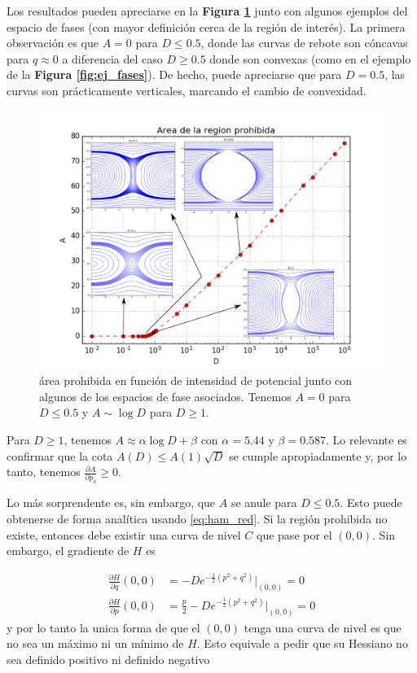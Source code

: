 \documentclass[twoside, 12pt]{article}
\providecommand{\dpart}[2]{\frac{\partial#1}{\partial#2}}
\begin{document}
Los resultados pueden apreciarse en la \textbf{Figura \ref{fig:AvsD}} junto con algunos ejemplos del espacio de fases (con mayor definición cerca de la región de interés).
La primera observación es que $A=0$ para $D\leq 0.5$, donde las curvas de rebote son cóncavas para $q\approx 0$ a diferencia del caso $D\geq 0.5$ donde son convexas (como en el ejemplo
de la \textbf{Figura \ref{fig:ej_fases}}). De hecho, puede apreciarse que para $D=0.5$, las curvas son prácticamente verticales, marcando el cambio de convexidad.

\begin{figure}[H]
	\centering
	\includegraphics[trim = 0mm 0mm 15mm 10mm, clip, width=\columnwidth]{AvsD_full.pdf}
	\caption{área prohibida en función de intensidad de potencial junto con algunos de los espacios de fase asociados. Tenemos $A=0$ para $D\leq 0.5$ y $A\sim \log{D}$ para $D\geq 1$.}
	\label{fig:AvsD}
\end{figure}

Para $D\geq 1$, tenemos $A \approx \alpha \log{D} + \beta$ con $\alpha = 5.44$ y $\beta = 0.587$.
Lo relevante es confirmar que la cota $A(D) \leq A(1)\sqrt{D}$ se cumple apropiadamente y, por lo tanto, tenemos $\dpart{A}{p_o} \geq 0$.

Lo más sorprendente es, sin embargo, que $A$ se anule para $D\leq 0.5$. Esto puede obtenerse de forma analítica usando \eqref{eq:ham_red}.
Si la región prohibida no existe, entonces debe existir una curva de nivel $C$ que pase por el $(0,0)$.
Sin embargo, el gradiente de $H$ es

\begin{align*}
\dpart{H}{q}(0,0) &= -De^{-\frac{1}{2} (p^2+q^2)}\Big|_{(0,0)} = 0 \\
\dpart{H}{p}(0,0) &= \frac{p}{2} - De^{-\frac{1}{2} (p^2+q^2)}\Big|_{(0,0)} = 0
\end{align*}
y por lo tanto la unica forma de que el $(0,0)$ tenga una curva de nivel es que no sea un máximo ni un mínimo de $H$.
Esto equivale a pedir que su Hessiano no sea definido positivo ni definido negativo
\end{document}
